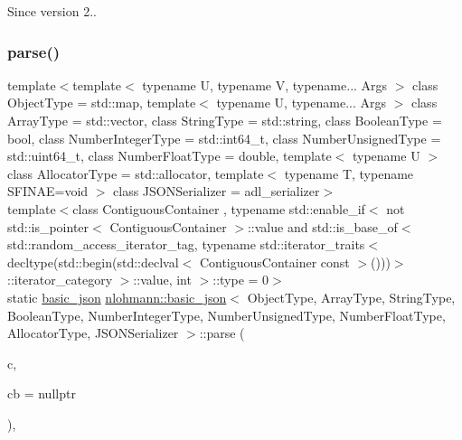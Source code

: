 \begin{DoxySince}{Since}
version 2.. 
\end{DoxySince}
\mbox{\label{classnlohmann_1_1basic__json_a00795fca3388571ba4a56a1ea6e0466b}} 
\subsubsection{\texorpdfstring{parse()}{parse()}\hspace{0.1cm}{\footnotesize\ttfamily [6/6]}}
{\footnotesize\ttfamily template$<$template$<$ typename U, typename V, typename... Args $>$ class Object\+Type = std\+::map, template$<$ typename U, typename... Args $>$ class Array\+Type = std\+::vector, class String\+Type  = std\+::string, class Boolean\+Type  = bool, class Number\+Integer\+Type  = std\+::int64\+\_\+t, class Number\+Unsigned\+Type  = std\+::uint64\+\_\+t, class Number\+Float\+Type  = double, template$<$ typename U $>$ class Allocator\+Type = std\+::allocator, template$<$ typename T, typename S\+F\+I\+N\+A\+E=void $>$ class J\+S\+O\+N\+Serializer = adl\+\_\+serializer$>$ \\
template$<$class Contiguous\+Container , typename std\+::enable\+\_\+if$<$ not std\+::is\+\_\+pointer$<$ Contiguous\+Container $>$\+::value and std\+::is\+\_\+base\+\_\+of$<$ std\+::random\+\_\+access\+\_\+iterator\+\_\+tag, typename std\+::iterator\+\_\+traits$<$ decltype(std\+::begin(std\+::declval$<$ Contiguous\+Container const $>$()))$>$\+::iterator\+\_\+category $>$\+::value, int $>$\+::type  = 0$>$ \\
static \mbox{\hyperlink{classnlohmann_1_1basic__json}{basic\+\_\+json}} \mbox{\hyperlink{classnlohmann_1_1basic__json}{nlohmann\+::basic\+\_\+json}}$<$ Object\+Type, Array\+Type, String\+Type, Boolean\+Type, Number\+Integer\+Type, Number\+Unsigned\+Type, Number\+Float\+Type, Allocator\+Type, J\+S\+O\+N\+Serializer $>$\+::parse (\begin{DoxyParamCaption}\item[{const Contiguous\+Container \&}]{c,  }\item[{const \mbox{\hyperlink{classnlohmann_1_1basic__json_aecae491e175f8767c550ae3c59e180e3}{parser\+\_\+callback\+\_\+t}}}]{cb = {\ttfamily nullptr} }\end{DoxyParamCaption})\hspace{0.3cm}{\ttfamily [inline]}, {\ttfamily [static]}}



